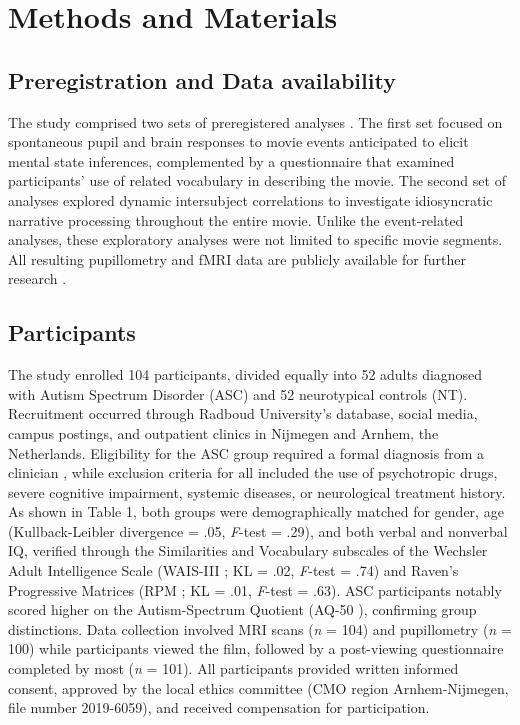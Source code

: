 \section*{Methods and Materials}
\subsection*{Preregistration and Data availability}
The study comprised two sets of preregistered analyses \citep{mangnus2022}. The first set focused on spontaneous pupil and brain responses to movie events anticipated to elicit mental state inferences, complemented by a questionnaire that examined participants' use of related vocabulary in describing the movie. The second set of analyses explored dynamic intersubject correlations to investigate idiosyncratic narrative processing throughout the entire movie. Unlike the event-related analyses, these exploratory analyses were not limited to specific movie segments. All resulting pupillometry and fMRI data are publicly available for further research \citep{mangnus2024dataset}.

\subsection*{Participants}
The study enrolled 104 participants, divided equally into 52 adults diagnosed with Autism Spectrum Disorder (ASC) and 52 neurotypical controls (NT). Recruitment occurred through Radboud University's database, social media, campus postings, and outpatient clinics in Nijmegen and Arnhem, the Netherlands. Eligibility for the ASC group required a formal diagnosis from a clinician \citep{apa2013}, while exclusion criteria for all included the use of psychotropic drugs, severe cognitive impairment, systemic diseases, or neurological treatment history. As shown in Table 1, both groups were demographically matched for gender, age (Kullback-Leibler divergence = .05, \textit{F}-test = .29), and both verbal and nonverbal IQ, verified through the Similarities and Vocabulary subscales of the Wechsler Adult Intelligence Scale (WAIS-III \citep{wechsler1997}; KL = .02, \textit{F}-test = .74) and Raven's Progressive Matrices (RPM \citep{raven1989}; KL = .01, \textit{F}-test = .63). ASC participants notably scored higher on the Autism-Spectrum Quotient (AQ-50 \citep{baron-cohen2001AQ}), confirming group distinctions. Data collection involved MRI scans (\textit{n} = 104) and pupillometry (\textit{n} = 100) while participants viewed the film, followed by a post-viewing questionnaire completed by most (\textit{n} = 101). All participants provided written informed consent, approved by the local ethics committee (CMO region Arnhem-Nijmegen, file number 2019-6059), and received compensation for participation.

